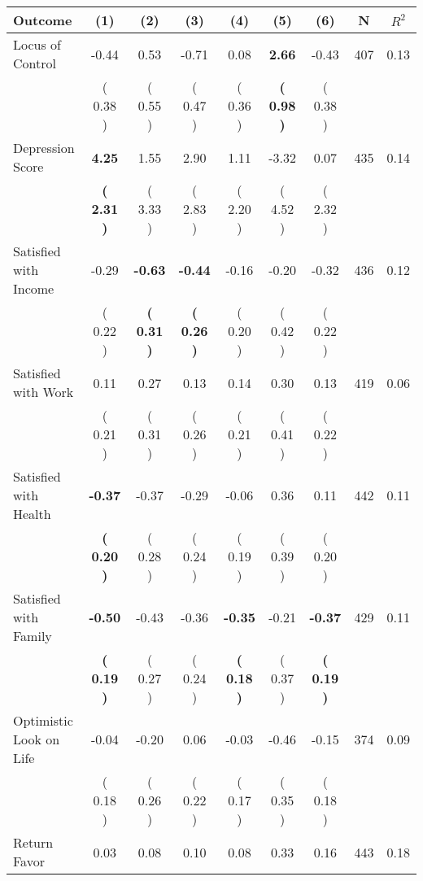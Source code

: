 \begin{tabular}{lcccccccc}
\toprule
 \textbf{Outcome} & \textbf{(1)} & \textbf{(2)} & \textbf{(3)} & \textbf{(4)} & \textbf{(5)} & \textbf{(6)} & \textbf{N} & \textbf{$ R^2$} \\
\midrule
Locus of Control &     -0.44 &      0.53 &     -0.71 &      0.08 & \textbf{     2.66} &     -0.43 & 407 &       0.13 \\ 
 & (     0.38 ) & (     0.55 ) & (     0.47 ) & (     0.36 ) & \textbf{(     0.98 )} & (     0.38 ) & \\
Depression Score & \textbf{     4.25} &      1.55 &      2.90 &      1.11 &     -3.32 &      0.07 & 435 &       0.14 \\ 
 & \textbf{(     2.31 )} & (     3.33 ) & (     2.83 ) & (     2.20 ) & (     4.52 ) & (     2.32 ) & \\
Satisfied with Income &     -0.29 & \textbf{    -0.63} & \textbf{    -0.44} &     -0.16 &     -0.20 &     -0.32 & 436 &       0.12 \\ 
 & (     0.22 ) & \textbf{(     0.31 )} & \textbf{(     0.26 )} & (     0.20 ) & (     0.42 ) & (     0.22 ) & \\
Satisfied with Work &      0.11 &      0.27 &      0.13 &      0.14 &      0.30 &      0.13 & 419 &       0.06 \\ 
 & (     0.21 ) & (     0.31 ) & (     0.26 ) & (     0.21 ) & (     0.41 ) & (     0.22 ) & \\
Satisfied with Health & \textbf{    -0.37} &     -0.37 &     -0.29 &     -0.06 &      0.36 &      0.11 & 442 &       0.11 \\ 
 & \textbf{(     0.20 )} & (     0.28 ) & (     0.24 ) & (     0.19 ) & (     0.39 ) & (     0.20 ) & \\
Satisfied with Family & \textbf{    -0.50} &     -0.43 &     -0.36 & \textbf{    -0.35} &     -0.21 & \textbf{    -0.37} & 429 &       0.11 \\ 
 & \textbf{(     0.19 )} & (     0.27 ) & (     0.24 ) & \textbf{(     0.18 )} & (     0.37 ) & \textbf{(     0.19 )} & \\
Optimistic Look on Life &     -0.04 &     -0.20 &      0.06 &     -0.03 &     -0.46 &     -0.15 & 374 &       0.09 \\ 
 & (     0.18 ) & (     0.26 ) & (     0.22 ) & (     0.17 ) & (     0.35 ) & (     0.18 ) & \\
Return Favor &      0.03 &      0.08 &      0.10 &      0.08 &      0.33 &      0.16 & 443 &       0.18 \\ 

\end{tabular}
